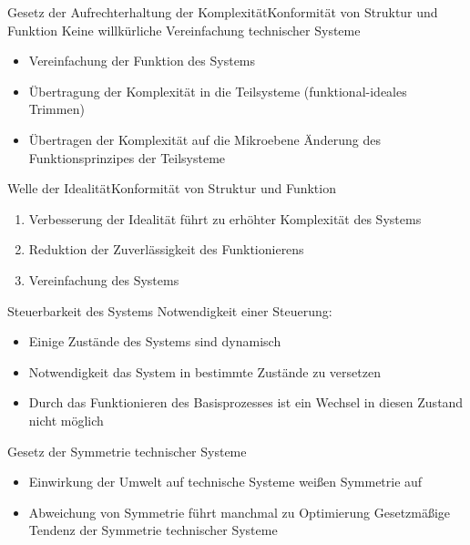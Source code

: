 \documentclass[aspectratio=169]{beamer}
\begin{document}
    \begin{frame}{Gesetz der Aufrechterhaltung der Komplexität}{Konformität von Struktur und Funktion}
        Keine willkürliche Vereinfachung technischer Systeme
        \vfill
        \begin{itemize}
            \item Vereinfachung der Funktion des Systems
            \item Übertragung der Komplexität in die Teilsysteme (funktional-ideales Trimmen)
            \item Übertragen der Komplexität auf die Mikroebene \newline
            {\scriptsize Änderung des Funktionsprinzipes der Teilsysteme}
        \end{itemize}
    \end{frame}

    \begin{frame}{Welle der Idealität}{Konformität von Struktur und Funktion}
        \begin{enumerate}
            \item Verbesserung der Idealität führt zu erhöhter Komplexität des Systems
            \item Reduktion der Zuverlässigkeit des Funktionierens
            \item Vereinfachung des Systems
        \end{enumerate}
    \end{frame}

    \begin{frame}{Steuerbarkeit des Systems}
        Notwendigkeit einer Steuerung:
        \begin{itemize}
            \item Einige Zustände des Systems sind dynamisch
            \item Notwendigkeit das System in bestimmte Zustände zu versetzen
            \item Durch das Funktionieren des Basisprozesses ist ein Wechsel in diesen Zustand nicht möglich
        \end{itemize}
    \end{frame}

    \begin{frame}{Gesetz der Symmetrie technischer Systeme}
        \begin{itemize}
            \item Einwirkung der Umwelt auf technische Systeme weißen Symmetrie auf
            \item Abweichung von Symmetrie führt manchmal zu Optimierung \newline
            {\scriptsize Gesetzmäßige Tendenz der Symmetrie technischer Systeme}
        \end{itemize}
    \end{frame}
\end{document}
